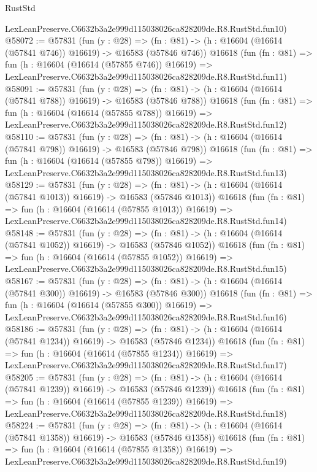 \begin{lexlean}{RustStd}
\begin{coremodule}
    LexLeanPreserve.C6632b3a2e999d115038026ca828209de.R8.RustStd.fun10)
@58072 := @57831
    (fun (y : @28) =>
    (fn : @81) -> (h : @16604 (@16614 (@57841 @746)) @16619) -> @16583 (@57846 @746))
    @16618
    (fun (fn : @81) =>
    fun (h : @16604 (@16614 (@57855 @746)) @16619) =>
    LexLeanPreserve.C6632b3a2e999d115038026ca828209de.R8.RustStd.fun11)
@58091 := @57831
    (fun (y : @28) =>
    (fn : @81) -> (h : @16604 (@16614 (@57841 @788)) @16619) -> @16583 (@57846 @788))
    @16618
    (fun (fn : @81) =>
    fun (h : @16604 (@16614 (@57855 @788)) @16619) =>
    LexLeanPreserve.C6632b3a2e999d115038026ca828209de.R8.RustStd.fun12)
@58110 := @57831
    (fun (y : @28) =>
    (fn : @81) -> (h : @16604 (@16614 (@57841 @798)) @16619) -> @16583 (@57846 @798))
    @16618
    (fun (fn : @81) =>
    fun (h : @16604 (@16614 (@57855 @798)) @16619) =>
    LexLeanPreserve.C6632b3a2e999d115038026ca828209de.R8.RustStd.fun13)
@58129 := @57831
    (fun (y : @28) =>
    (fn : @81) -> (h : @16604 (@16614 (@57841 @1013)) @16619) -> @16583 (@57846 @1013))
    @16618
    (fun (fn : @81) =>
    fun (h : @16604 (@16614 (@57855 @1013)) @16619) =>
    LexLeanPreserve.C6632b3a2e999d115038026ca828209de.R8.RustStd.fun14)
@58148 := @57831
    (fun (y : @28) =>
    (fn : @81) -> (h : @16604 (@16614 (@57841 @1052)) @16619) -> @16583 (@57846 @1052))
    @16618
    (fun (fn : @81) =>
    fun (h : @16604 (@16614 (@57855 @1052)) @16619) =>
    LexLeanPreserve.C6632b3a2e999d115038026ca828209de.R8.RustStd.fun15)
@58167 := @57831
    (fun (y : @28) =>
    (fn : @81) -> (h : @16604 (@16614 (@57841 @300)) @16619) -> @16583 (@57846 @300))
    @16618
    (fun (fn : @81) =>
    fun (h : @16604 (@16614 (@57855 @300)) @16619) =>
    LexLeanPreserve.C6632b3a2e999d115038026ca828209de.R8.RustStd.fun16)
@58186 := @57831
    (fun (y : @28) =>
    (fn : @81) -> (h : @16604 (@16614 (@57841 @1234)) @16619) -> @16583 (@57846 @1234))
    @16618
    (fun (fn : @81) =>
    fun (h : @16604 (@16614 (@57855 @1234)) @16619) =>
    LexLeanPreserve.C6632b3a2e999d115038026ca828209de.R8.RustStd.fun17)
@58205 := @57831
    (fun (y : @28) =>
    (fn : @81) -> (h : @16604 (@16614 (@57841 @1239)) @16619) -> @16583 (@57846 @1239))
    @16618
    (fun (fn : @81) =>
    fun (h : @16604 (@16614 (@57855 @1239)) @16619) =>
    LexLeanPreserve.C6632b3a2e999d115038026ca828209de.R8.RustStd.fun18)
@58224 := @57831
    (fun (y : @28) =>
    (fn : @81) -> (h : @16604 (@16614 (@57841 @1358)) @16619) -> @16583 (@57846 @1358))
    @16618
    (fun (fn : @81) =>
    fun (h : @16604 (@16614 (@57855 @1358)) @16619) =>
    LexLeanPreserve.C6632b3a2e999d115038026ca828209de.R8.RustStd.fun19)

\end{coremodule}
\end{lexlean}
